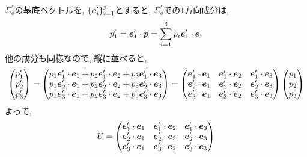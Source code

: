 \documentclass{jsarticle}
\newcommand*{\mbold}[1]{\mbox{\boldmath $#1$}}
\begin{document}
$\Sigma^\prime_{o}$の基底ベクトルを, $\{ \mbold{e}^\prime_i \}_{i = 1}^{3}$とすると, 
$\Sigma^\prime_{o}$での$1$方向成分は, 
\begin{equation}
  p^\prime_1 = \mbold{e}^\prime_1 \cdot \mbold{p}
  =\sum_{i = 1}^3 p_i \mbold{e}^\prime_1 \cdot \mbold{e}_i
\end{equation}
他の成分も同様なので, 縦に並べると, 
\begin{equation}
  \begin{pmatrix}
    p^\prime_1 \\
    p^\prime_2 \\
    p^\prime_3
  \end{pmatrix}
  =
  \begin{pmatrix}
    p_1 \mbold{e}^\prime_1 \cdot \mbold{e}_1 + p_2 \mbold{e}^\prime_1 \cdot \mbold{e}_2 + p_3 \mbold{e}^\prime_1 \cdot \mbold{e}_3 \\
    p_1 \mbold{e}^\prime_2 \cdot \mbold{e}_1 + p_2 \mbold{e}^\prime_2 \cdot \mbold{e}_2 + p_3 \mbold{e}^\prime_2 \cdot \mbold{e}_3 \\
    p_1 \mbold{e}^\prime_3 \cdot \mbold{e}_1 + p_2 \mbold{e}^\prime_3 \cdot \mbold{e}_2 + p_3 \mbold{e}^\prime_3 \cdot \mbold{e}_3 
  \end{pmatrix}
  =
  \begin{pmatrix}
    \mbold{e}^\prime_1 \cdot \mbold{e}_1 & \mbold{e}^\prime_1 \cdot \mbold{e}_2 & \mbold{e}^\prime_1 \cdot \mbold{e}_3 \\
    \mbold{e}^\prime_2 \cdot \mbold{e}_1 & \mbold{e}^\prime_2 \cdot \mbold{e}_2 & \mbold{e}^\prime_2 \cdot \mbold{e}_3 \\
    \mbold{e}^\prime_3 \cdot \mbold{e}_1 & \mbold{e}^\prime_3 \cdot \mbold{e}_2 & \mbold{e}^\prime_3 \cdot \mbold{e}_3
  \end{pmatrix}
  \begin{pmatrix}
    p_1 \\
    p_2 \\
    p_3
  \end{pmatrix}
\end{equation}
よって, 
\begin{equation}
  U = 
  \begin{pmatrix}
    \mbold{e}^\prime_1 \cdot \mbold{e}_1 & \mbold{e}^\prime_1 \cdot \mbold{e}_2 & \mbold{e}^\prime_1 \cdot \mbold{e}_3 \\
    \mbold{e}^\prime_2 \cdot \mbold{e}_1 & \mbold{e}^\prime_2 \cdot \mbold{e}_2 & \mbold{e}^\prime_2 \cdot \mbold{e}_3 \\
    \mbold{e}^\prime_3 \cdot \mbold{e}_1 & \mbold{e}^\prime_3 \cdot \mbold{e}_2 & \mbold{e}^\prime_3 \cdot \mbold{e}_3
  \end{pmatrix}
\end{equation}
\end{document}
